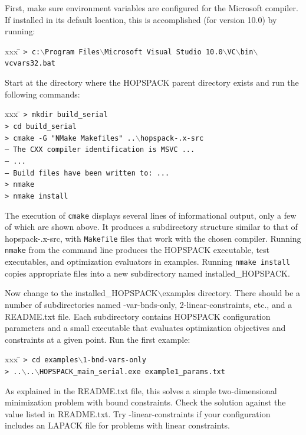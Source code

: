 First, make sure environment variables are configured for the Microsoft compiler.
If installed in its default location, this is accomplished (for version 10.0)
by running:
\vspace{-11pt}
\begin{tabbing}
  xxx \= \kill
  \> {\tt > c:$\backslash$Program Files$\backslash$Microsoft Visual Studio 10.0$\backslash$VC$\backslash$bin$\backslash$vcvars32.bat}
\end{tabbing}

Start at the directory where the HOPSPACK parent directory exists and
run the following commands:
\vspace{-11pt}
\begin{tabbing}
  xxx \= \kill
  \> {\tt > mkdir build\_serial} \\
  \> {\tt > cd build\_serial} \\
  \> {\tt > cmake -G "NMake Makefiles"
            ..$\backslash$hopspack-\HOPSVER.x-src} \\
  \> {\tt -- The CXX compiler identification is MSVC ...} \\
  \> {\tt -- ...} \\
  \> {\tt -- Build files have been written to: ...} \\
  \> {\tt > nmake} \\
  \> {\tt > nmake install}
\end{tabbing}
\vspace{-11pt}
The execution of {\tt cmake} displays several lines of informational output,
only a few of which are shown above.
It produces a subdirectory structure similar to that of
{\sf hopspack-\HOPSVER.x-src},
with {\tt Makefile} files that work with the chosen compiler.  Running
{\tt nmake} from the command line produces the HOPSPACK executable, test
executables, and optimization evaluators in {\sf examples}.
Running {\tt nmake install} copies appropriate files into a new subdirectory
named {\sf installed\_HOPSPACK}.

Now change to the {\sf installed\_HOPSPACK$\backslash$examples} directory.
There should be a number of
subdirectories named {-var-bnds-only, 2-linear-constraints}, etc.,
and a {\sf README.txt} file.  Each subdirectory contains HOPSPACK
configuration parameters and a small executable that evaluates optimization
objectives and constraints at a given point.
Run the first example:
\vspace{-11pt}
\begin{tabbing}
  xxx \= \kill
  \> {\tt > cd examples$\backslash$1-bnd-vars-only} \\
  \> {\tt > ..$\backslash$..$\backslash$HOPSPACK\_main\_serial.exe example1\_params.txt}
\end{tabbing}
\vspace{-11pt}
As explained in the {\sf README.txt} file, this solves a simple two-dimensional
minimization problem with bound constraints.  Check the solution against
the value listed in {\sf README.txt}.
Try {-linear-constraints} if your configuration includes an LAPACK file
for problems with linear constraints.


